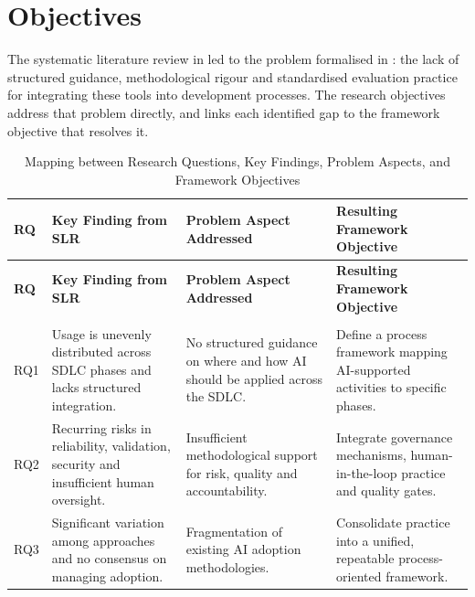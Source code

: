 \section{Objectives}
\label{sec:objectives}

The systematic literature review in  led to the problem formalised in : the lack of structured guidance, methodological rigour and standardised evaluation practice for integrating these tools into development processes. The research objectives address that problem directly, and  links each identified gap to the framework objective that resolves it.

{\footnotesize
\begin{longtable}{>{\raggedright\arraybackslash}p{0.6cm}
                  >{\raggedright\arraybackslash}p{5.0cm}
                  >{\raggedright\arraybackslash}p{3.0cm}
                  >{\raggedright\arraybackslash}p{5.0cm}}
\caption[Research questions, key findings, problem aspects and framework objectives]{Mapping between Research Questions, Key Findings, Problem Aspects, and Framework Objectives}
\label{tab:rq_objective_mapping} \\

\toprule
\textbf{RQ} & \textbf{Key Finding from SLR} & \textbf{Problem Aspect Addressed} & \textbf{Resulting Framework Objective} \\
\midrule
\endfirsthead

\toprule
\textbf{RQ} & \textbf{Key Finding from SLR} & \textbf{Problem Aspect Addressed} & \textbf{Resulting Framework Objective} \\
\midrule
\endhead

\midrule
\multicolumn{4}{r}{\textit{Continued on next page}}\\
\bottomrule
\endfoot

\bottomrule
\endlastfoot

RQ1 &
Usage is unevenly distributed across \ac{SDLC} phases and lacks structured integration. &
No structured guidance on where and how \ac{AI} should be applied across the \ac{SDLC}. &
Define a process framework mapping AI-supported activities to specific phases. \\ \addlinespace

RQ2 &
Recurring risks in reliability, validation, security and insufficient human oversight. &
Insufficient methodological support for risk, quality and accountability. &
Integrate governance mechanisms, human-in-the-loop practice and quality gates. \\ \addlinespace

RQ3 &
Significant variation among approaches and no consensus on managing adoption. &
Fragmentation of existing AI adoption methodologies. &
Consolidate practice into a unified, repeatable process-oriented framework. \\

\end{longtable}
}

